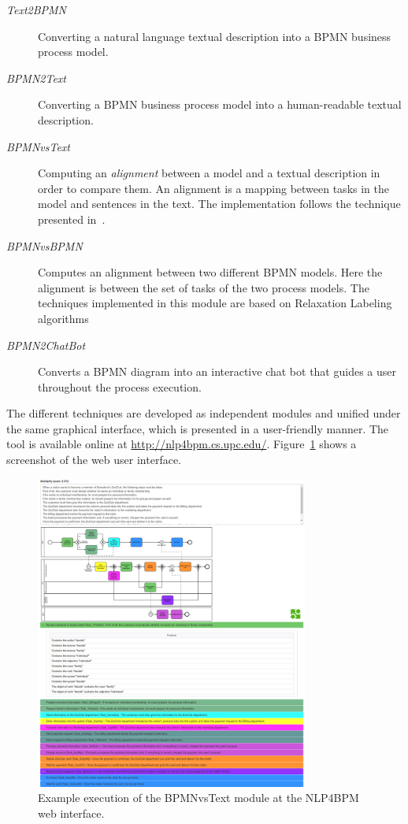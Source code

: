\begin{description}
\item[\emph{Text2BPMN}]{Converting a natural language textual description into a
  BPMN business process model.}  
\item[\emph{BPMN2Text}]{Converting a BPMN business process model into a
    human-readable textual description.}  
\item[\emph{BPMNvsText}]{Computing an \emph{alignment} between a model and a
    textual description in order to compare them. An alignment is a mapping
    between tasks in the model and sentences in the text. The implementation
    follows the technique presented in~\cite{10.1007/978-3-319-59536-8_26}.}  
\item[\emph{BPMNvsBPMN}]{Computes an alignment between two different BPMN
    models. Here the alignment is between the set of tasks of the two process
    models. The techniques implemented in this module are based on Relaxation
    Labeling algorithms}  
\item[\emph{BPMN2ChatBot}]{Converts a BPMN diagram into an interactive chat bot
    that guides a user throughout the process execution.}
\end{description}

The different techniques are developed as independent modules and unified under
the same graphical interface, which is presented in a user-friendly manner. The
tool is available online at \url{http://nlp4bpm.cs.upc.edu/}.
Figure~\ref{fig:nlp4bpm_example} shows a screenshot of the web user interface.

\begin{figure}[htb]
  \centering
  \includegraphics[width=0.8\textwidth]{figures/nlp4bpm}
  \caption{Example execution of the BPMNvsText module at the NLP4BPM web
    interface.}
  \label{fig:nlp4bpm_example}
\end{figure}

